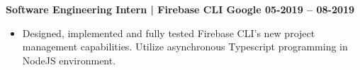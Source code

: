 \textbf{Software Engineering Intern | Firebase CLI \hspace{-10mm} \hfill Google \hfill  05-2019 -- 08-2019}\par

\begin{itemize}
        \item Designed, implemented and fully tested Firebase CLI’s new project management capabilities. Utilize asynchronous Typescript programming in NodeJS environment.
\end{itemize}\par